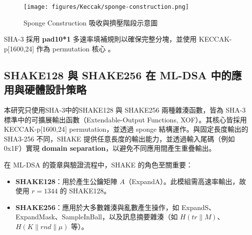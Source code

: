 \documentclass[12pt, a4paper, fleqn]{./styles/ntust_report}
\begin{document}
\begin{figure}[H]
    \centering
    \texttt{[image: figures/Keccak/sponge-construction.png]}
    \caption{Sponge Construction 吸收與擠壓階段示意圖}
\end{figure}

SHA-3 採用 \textbf{pad10*1} 多速率填補規則以確保完整分塊，並使用 KECCAK-p[1600,24] 作為 permutation 核心 \cite{FIPS202}。




%
%
%
%




\subsection{SHAKE128 與 SHAKE256 在 ML-DSA 中的應用與硬體設計策略}

本研究只使用SHA-3中的SHAKE128 與 SHAKE256 兩種雜湊函數，皆為 SHA-3 標準中的可擴展輸出函數（Extendable-Output Functions, XOF）。其核心皆採用 KECCAK-p[1600,24] permutation，並透過 sponge 結構運作。與固定長度輸出的 SHA3-256 不同，SHAKE 提供任意長度的輸出能力，並透過輸入尾碼（例如 0x1F）實現 \textbf{domain separation}，以避免不同應用間產生重疊輸出。

在 ML-DSA 的簽章與驗證流程中，SHAKE 的角色至關重要：
\begin{itemize}
    \item \textbf{SHAKE128}：用於產生公鑰矩陣 $A$（ExpandA）。此模組需高速率輸出，故使用 $r=1344$ 的 SHAKE128。
    \item \textbf{SHAKE256}：應用於大多數雜湊與亂數產生操作，如 ExpandS、ExpandMask、SampleInBall，以及訊息摘要雜湊（如 $H(tr\|M)$、$H(K\|rnd\|\mu)$ 等）。
\end{itemize}
\end{document}
